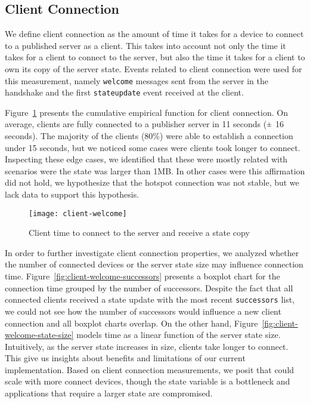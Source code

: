 \subsection{Client Connection}
\label{sub:eval:connection}


We define client connection as the amount of time it takes for a device to connect to a published server as a client. 
This takes into account not only the time it takes for a client to connect to the server, but also the time it takes for a client to own its copy of the server state. 
Events related to client connection were used for this measurement, namely \texttt{welcome} messages sent from the server in the handshake and the first \texttt{stateupdate} event received at the client.

Figure~\ref{fig:client-welcome} presents the cumulative empirical function for client connection.
On average, clients are fully connected to a publisher server in 11 seconds ($\rpm$ 16 seconds). 
The majority of the clients (80\%) were able to establish a connection under 15 seconds, 
but we noticed some cases were clients took longer to connect. 
Inspecting these edge cases, we identified that these were mostly related with scenarios were the state was larger than 1MB. 
In other cases were this affirmation did not hold, we hypothesize that the hotspot connection was not stable, but we lack data to support this hypothesis.


\begin{figure}
    \centering
    \texttt{[image: client-welcome]}
    \caption{Client time to connect to the server and receive a state copy}
    \label{fig:client-welcome}
\end{figure}


In order to further investigate client connection properties, we analyzed whether the number of connected devices or the server state size may influence connection time.
Figure~\ref{fig:client-welcome-successors} presents a boxplot chart for the connection time grouped by the number of successors. 
Despite the fact that all connected clients received a state update with the most recent \texttt{successors} list, 
we could not see how the number of successors would influence a new client connection and all boxplot charts overlap.
On the other hand, Figure~\ref{fig:client-welcome-state-size} models time as a linear function of the server state size.
Intuitively, as the server state increases in size, clients take longer to connect. 
This give us insights about benefits and limitations of our current implementation.
Based on client connection measurements, we posit that \APIshort could scale with more connect devices, though the state variable is a bottleneck and applications that require a larger state are compromised.


